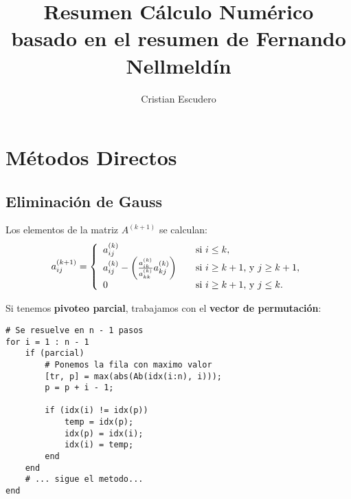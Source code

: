\documentclass[10pt,a4paper]{article}
\author{Cristian Escudero}
\title{Resumen Cálculo Numérico \\ \small{basado en el resumen de Fernando Nellmeldín}}
\begin{document}
\maketitle


\section{Métodos Directos}

\subsection{Eliminación de Gauss}
Los elementos de la matriz $A^{(k+1)}$ se calculan:
\begin{align*}
  a_{ij}^{(k+1)} = \left\{ 
  \begin{array}{l l}
    a_{ij}^{(k)} & \quad \text{si $i\leq k$},\\
    a_{ij}^{(k)}-\left(\frac{a_{ik}^{(k)}}{a_{kk}^{(k)}}a_{kj}^{(k)}\right) & \quad \text{si $i \geq k+1$, y $j \geq k+1$},\\
    0 &\quad \text{si $i \geq k+1$, y $j \leq k$}.
  \end{array} \right.
\end{align*}

Si tenemos \textbf{pivoteo parcial}, trabajamos con el \textbf{vector de permutación}:
\begin{lstlisting}
# Se resuelve en n - 1 pasos
for i = 1 : n - 1
	if (parcial)
		# Ponemos la fila con maximo valor
	    [tr, p] = max(abs(Ab(idx(i:n), i)));
	    p = p + i - 1;
    
		if (idx(i) != idx(p))	        
			temp = idx(p);
			idx(p) = idx(i);
			idx(i) = temp;
	    end
	end
	# ... sigue el metodo...
end
\end{lstlisting}
\end{document}
